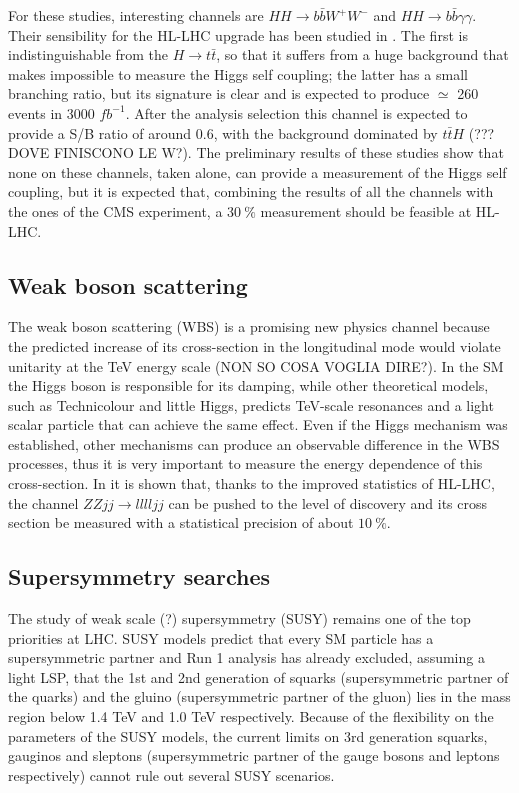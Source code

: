 \documentclass[a4paper,twoside,12pt]{article}
\begin{document}
For these studies, interesting channels are
$HH \rightarrow b\bar{b}W^+W^-$ and $HH \rightarrow b\bar{b}\gamma\gamma$. Their sensibility for the HL-LHC upgrade has been studied in \cite{HHStudies}. The first is 
indistinguishable from the $H \rightarrow t\bar{t}$, so that it suffers from a huge background
that makes impossible to measure the Higgs self coupling; the latter has a small branching
ratio, but its signature is clear and is expected to produce $\simeq$ 260 events in 3000 $fb^{-1}$. After the analysis selection this channel is expected to provide a S/B ratio of around 0.6, with the background
dominated by $t\bar{t}H$ (??? DOVE FINISCONO LE W?). The preliminary results of these
studies show that none on these channels, taken alone, can provide a measurement of
the Higgs self coupling, but it is expected that, combining the results of all the channels with 
the ones of the CMS experiment, a $30\ \%$ measurement should be feasible at HL-LHC.

\subsection{Weak boson scattering}
The weak boson scattering (WBS) is a promising new physics channel because the predicted increase of
its cross-section
in the longitudinal mode would violate unitarity at the TeV energy scale (NON SO COSA VOGLIA DIRE?). In the SM the Higgs
boson is responsible for its damping, while other theoretical models, such as Technicolour and 
little Higgs, predicts TeV-scale resonances and a light scalar particle that can achieve the same effect. Even if the Higgs
mechanism was established, other mechanisms can produce an observable difference in
the WBS processes, thus it is very important to measure the energy 
dependence of this cross-section. In \cite{WBS} it is shown that, thanks to the improved
statistics of HL-LHC, the channel $ZZjj \rightarrow lllljj$ can be pushed to the level of discovery and its cross section be measured with a statistical precision of about $10\ \%$.

\subsection{Supersymmetry searches}
The study of weak scale (?) supersymmetry (SUSY) remains one of the top priorities at LHC.
SUSY models predict that every SM particle has a supersymmetric partner and Run 1 analysis
has already excluded, assuming a light LSP, that the 1st and 2nd generation of squarks (supersymmetric partner of the quarks) and the gluino (supersymmetric partner of the gluon) lies in the mass region below 1.4 TeV and 1.0
TeV respectively. Because of the flexibility on the parameters of the SUSY models, 
the current limits on 3rd generation squarks, gauginos and sleptons (supersymmetric partner
of the gauge bosons and leptons respectively) cannot rule out several SUSY scenarios.\\
\end{document}
